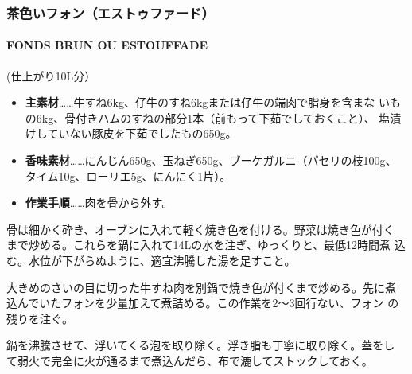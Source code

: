 \begin{recette}
\hypertarget{ux8336ux8272ux3044ux30d5ux30a9ux30f3ux30a8ux30b9ux30c8ux30a5ux30d5ux30a1ux30fcux30c9}{%
\subsubsection{茶色いフォン（エストゥファード）}\label{ux8336ux8272ux3044ux30d5ux30a9ux30f3ux30a8ux30b9ux30c8ux30a5ux30d5ux30a1ux30fcux30c9}}

\hypertarget{fonds-brun}{%
\paragraph{FONDS BRUN OU ESTOUFFADE}\label{fonds-brun}}


(仕上がり10L分）

\begin{itemize}
\item
  \textbf{主素材}\ldots{}\ldots{}牛すね6kg、仔牛のすね6kgまたは仔牛の端肉で脂身を含まな
  いもの6kg、骨付きハムのすねの部分1本（前もって下茹でしておくこと）、
  塩漬けしていない豚皮を下茹でしたもの650g。
\item
  \textbf{香味素材}\ldots{}\ldots{}にんじん650g、玉ねぎ650g、ブーケガルニ（パセリの枝100g、
  タイム10g、ローリエ5g、にんにく1片）。
\item
  \textbf{作業手順}\ldots{}\ldots{}肉を骨から外す。
\end{itemize}

骨は細かく砕き、オーブンに入れて軽く焼き色を付ける。野菜は焼き色が付く
まで炒める。これらを鍋に入れて14Lの水を注ぎ、ゆっくりと、最低12時間煮
込む。水位が下がらぬように、適宜沸騰した湯を足すこと。

大きめのさいの目に切った牛すね肉を別鍋で焼き色が付くまで炒める。先に煮
込んでいたフォンを少量加えて煮詰める。この作業を2〜3回行ない、フォン
の残りを注ぐ。

鍋を沸騰させて、浮いてくる泡を取り除く。浮き脂も丁寧に取り除く。蓋をし
て弱火で完全に火が通るまで煮込んだら、布で漉してストックしておく。


\end{recette}
